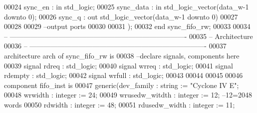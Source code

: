 \begin{DoxyCode}
00024         \textcolor{vhdlchar}{sync_en}   \textcolor{vhdlchar}{:} \textcolor{keywordflow}{in} \textcolor{comment}{std\_logic};
00025         \textcolor{vhdlchar}{sync_data} \textcolor{vhdlchar}{:} \textcolor{keywordflow}{in} \textcolor{comment}{std\_logic\_vector}\textcolor{vhdlchar}{(}\textcolor{vhdlchar}{data_w}\textcolor{vhdlchar}{-}\textcolor{vhdllogic}{}\textcolor{vhdllogic}{1} \textcolor{keywordflow}{downto} \textcolor{vhdllogic}{}\textcolor{vhdllogic}{0}\textcolor{vhdlchar}{)};
00026         \textcolor{vhdlchar}{sync_q}    \textcolor{vhdlchar}{:} \textcolor{keywordflow}{out} \textcolor{comment}{std\_logic\_vector}\textcolor{vhdlchar}{(}\textcolor{vhdlchar}{data_w}\textcolor{vhdlchar}{-}\textcolor{vhdllogic}{}\textcolor{vhdllogic}{1} \textcolor{keywordflow}{downto} \textcolor{vhdllogic}{}\textcolor{vhdllogic}{0}\textcolor{vhdlchar}{)}
00027         
00028 
00029 \textcolor{keyword}{        --output ports }
00030         
00031         \textcolor{vhdlchar}{)};
00032 \textcolor{keywordflow}{end} \textcolor{vhdlchar}{sync\_fifo\_rw};
00033 
00034 \textcolor{keyword}{-- ----------------------------------------------------------------------------}
00035 \textcolor{keyword}{-- Architecture}
00036 \textcolor{keyword}{-- ----------------------------------------------------------------------------}
00037 \textcolor{keywordflow}{architecture} arch \textcolor{keywordflow}{of} sync_fifo_rw is
00038 \textcolor{keyword}{--declare signals,  components here}
00039 \textcolor{keywordflow}{signal} \textcolor{vhdlchar}{rdreq}    \textcolor{vhdlchar}{:} \textcolor{comment}{std\_logic};
00040 \textcolor{keywordflow}{signal} \textcolor{vhdlchar}{wrreq}    \textcolor{vhdlchar}{:} \textcolor{comment}{std\_logic};
00041 \textcolor{keywordflow}{signal} \textcolor{vhdlchar}{rdempty}  \textcolor{vhdlchar}{:} \textcolor{comment}{std\_logic};
00042 \textcolor{keywordflow}{signal} \textcolor{vhdlchar}{wrfull}   \textcolor{vhdlchar}{:} \textcolor{comment}{std\_logic};
00043 
00044 
00045 
00046 \textcolor{keywordflow}{component} fifo_inst \textcolor{keywordflow}{is}
00047   \textcolor{keywordflow}{generic}(dev_family         : \textcolor{comment}{string}  := \textcolor{keyword}{"Cyclone IV E"};
00048           wrwidth         : \textcolor{comment}{integer} := \textcolor{vhdllogic}{}\textcolor{vhdllogic}{24};
00049           wrusedw_witdth  : \textcolor{comment}{integer} := \textcolor{vhdllogic}{}\textcolor{vhdllogic}{12}; \textcolor{keyword}{--12=2048 words }
00050           rdwidth         : \textcolor{comment}{integer} := \textcolor{vhdllogic}{}\textcolor{vhdllogic}{48};
00051           rdusedw_width   : \textcolor{comment}{integer} := \textcolor{vhdllogic}{}\textcolor{vhdllogic}{11};

\end{DoxyCode}
